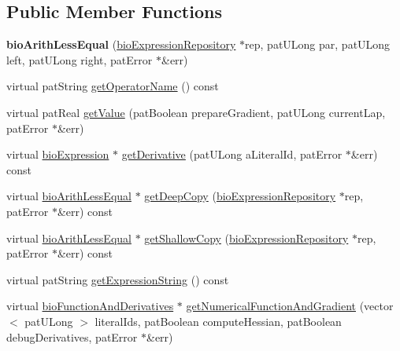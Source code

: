 \subsection*{Public Member Functions}
\begin{DoxyCompactItemize}
\item 
\mbox{\label{classbio_arith_less_equal_ab139689812ae96fca0155df7ec67f189}} 
{\bfseries bio\+Arith\+Less\+Equal} (\hyperlink{classbio_expression_repository}{bio\+Expression\+Repository} $\ast$rep, pat\+U\+Long par, pat\+U\+Long left, pat\+U\+Long right, pat\+Error $\ast$\&err)
\item 
virtual pat\+String \hyperlink{classbio_arith_less_equal_ad33162b75241a2efee3ace47e899de11}{get\+Operator\+Name} () const
\item 
virtual pat\+Real \hyperlink{classbio_arith_less_equal_af1741ef7a088b6a961889cd82fae3206}{get\+Value} (pat\+Boolean prepare\+Gradient, pat\+U\+Long current\+Lap, pat\+Error $\ast$\&err)
\item 
virtual \hyperlink{classbio_expression}{bio\+Expression} $\ast$ \hyperlink{classbio_arith_less_equal_aaaa08c34c10d1b89378dd0c67917239b}{get\+Derivative} (pat\+U\+Long a\+Literal\+Id, pat\+Error $\ast$\&err) const
\item 
virtual \hyperlink{classbio_arith_less_equal}{bio\+Arith\+Less\+Equal} $\ast$ \hyperlink{classbio_arith_less_equal_a47bbe003d35d47d8ff6545a5cf8dd389}{get\+Deep\+Copy} (\hyperlink{classbio_expression_repository}{bio\+Expression\+Repository} $\ast$rep, pat\+Error $\ast$\&err) const
\item 
virtual \hyperlink{classbio_arith_less_equal}{bio\+Arith\+Less\+Equal} $\ast$ \hyperlink{classbio_arith_less_equal_a47164bfceb3759082555502a38e9f70b}{get\+Shallow\+Copy} (\hyperlink{classbio_expression_repository}{bio\+Expression\+Repository} $\ast$rep, pat\+Error $\ast$\&err) const
\item 
virtual pat\+String \hyperlink{classbio_arith_less_equal_a82a5b4eeb77747bc674fbc16453f9d67}{get\+Expression\+String} () const
\item 
virtual \hyperlink{classbio_function_and_derivatives}{bio\+Function\+And\+Derivatives} $\ast$ \hyperlink{classbio_arith_less_equal_a718044c38d59fc7639656a7754bfb090}{get\+Numerical\+Function\+And\+Gradient} (vector$<$ pat\+U\+Long $>$ literal\+Ids, pat\+Boolean compute\+Hessian, pat\+Boolean debug\+Derivatives, pat\+Error $\ast$\&err)
\end{DoxyCompactItemize}
